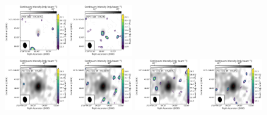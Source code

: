 \begin{figure}[htbp!]
  \includegraphics[width=0.24\textwidth]{./moment0/Set2_ID00_2_CH3OCH3_259311.pdf}
  \includegraphics[width=0.24\textwidth]{./moment0/Set2_ID00_2_CH3CN_257527.pdf}
  \\
  \includegraphics[width=0.24\textwidth]{./moment0/Set2_ID09_CH3OH_243915.pdf}
  \includegraphics[width=0.24\textwidth]{./moment0/Set2_ID09_CH3OCHO_259342.pdf}
  \includegraphics[width=0.24\textwidth]{./moment0/Set2_ID09_CH3OCH3_259311.pdf}
  \includegraphics[width=0.24\textwidth]{./moment0/Set2_ID09_CH3CN_257527.pdf}
  \\
  \caption{}
\end{figure}
\addtocounter{figure}{-1}
